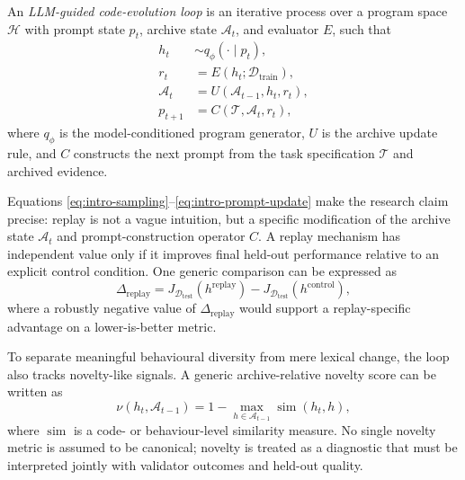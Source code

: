 \begin{definition}
An \emph{LLM-guided code-evolution loop} is an iterative process over a program space
$\mathcal{H}$ with prompt state $p_t$, archive state $\mathcal{A}_t$, and evaluator $E$, such that
\begin{align}
h_t &\sim q_{\phi}(\cdot \mid p_t), \label{eq:intro-sampling}\\
r_t &= E(h_t; \mathcal{D}_{\mathrm{train}}), \label{eq:intro-evaluation}\\
\mathcal{A}_t &= U(\mathcal{A}_{t-1}, h_t, r_t), \label{eq:intro-archive-update}\\
p_{t+1} &= C(\mathcal{T}, \mathcal{A}_t, r_t), \label{eq:intro-prompt-update}
\end{align}
where $q_{\phi}$ is the model-conditioned program generator, $U$ is the archive update rule, and
$C$ constructs the next prompt from the task specification $\mathcal{T}$ and archived evidence.
\end{definition}

Equations \eqref{eq:intro-sampling}--\eqref{eq:intro-prompt-update} make the research claim
precise: replay is not a vague intuition, but a specific modification of the archive state
$\mathcal{A}_t$ and prompt-construction operator $C$. A replay mechanism has independent value only
if it improves final held-out performance relative to an explicit control condition. One generic
comparison can be expressed as
\begin{equation}
\Delta_{\mathrm{replay}} =
J_{\mathcal{D}_{\mathrm{test}}}\!\left(h^{\mathrm{replay}}\right) -
J_{\mathcal{D}_{\mathrm{test}}}\!\left(h^{\mathrm{control}}\right),
\label{eq:intro-replay-delta}
\end{equation}
where a robustly negative value of $\Delta_{\mathrm{replay}}$ would support a replay-specific
advantage on a lower-is-better metric.

To separate meaningful behavioural diversity from mere lexical change, the loop also tracks
novelty-like signals. A generic archive-relative novelty score can be written as
\begin{equation}
\nu(h_t,\mathcal{A}_{t-1}) =
1 - \max_{h \in \mathcal{A}_{t-1}} \operatorname{sim}(h_t,h),
\label{eq:intro-novelty}
\end{equation}
where $\operatorname{sim}$ is a code- or behaviour-level similarity measure. No single novelty
metric is assumed to be canonical; novelty is treated as a diagnostic that must be interpreted
jointly with validator outcomes and held-out quality.


